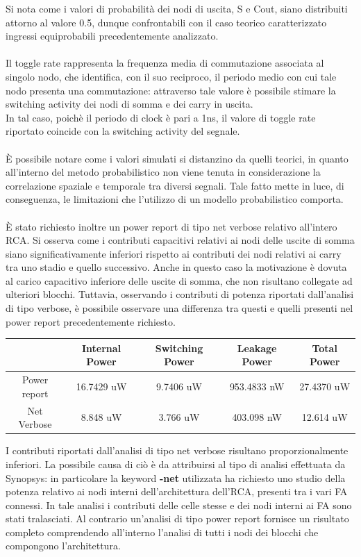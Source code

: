 \documentclass[11pt,  english, makeidx, a4paper, titlepage, oneside]{book}
\begin{document}
Si nota come i valori di probabilità dei
nodi di uscita, S e Cout, siano distribuiti attorno al valore 0.5, dunque confrontabili con il caso teorico caratterizzato ingressi equiprobabili precedentemente analizzato.
\\\\
Il toggle rate rappresenta la frequenza media di commutazione associata al singolo nodo, che identifica, con il suo reciproco, il periodo medio
con cui tale nodo presenta una commutazione: attraverso tale valore è possibile stimare la switching activity dei nodi di somma e dei carry in uscita.
\\
In tal caso, poichè il periodo di clock è pari a 1ns, il valore di toggle rate riportato coincide con la switching activity del segnale.
\\\\
È possibile notare come i valori simulati si distanzino da quelli teorici, in quanto all'interno del metodo probabilistico non viene tenuta in considerazione la correlazione spaziale e temporale tra diversi segnali. Tale fatto mette in luce, di conseguenza, le limitazioni che l'utilizzo di un modello probabilistico comporta.
\\\\
È stato richiesto inoltre un power report di tipo net verbose relativo all'intero RCA. Si osserva come i contributi capacitivi relativi
ai nodi delle uscite di somma siano significativamente inferiori rispetto ai contributi dei nodi relativi ai carry tra uno stadio e quello successivo.
Anche in questo caso la motivazione è dovuta al carico capacitivo inferiore delle uscite di somma, che non risultano collegate ad ulteriori
blocchi. Tuttavia, osservando i contributi di potenza riportati dall'analisi di tipo verbose, è possibile osservare una differenza tra questi e 
quelli presenti nel power report precedentemente richiesto. 
\\
\begin{center}
	\begin{tabular}{|c|c|c|c|c|}
	\hline
	& Internal Power & Switching Power & Leakage Power & Total Power \\ 
	\hline
	Power report & 16.7429 uW & 9.7406 uW & 953.4833 nW & 27.4370 uW \\
	\hline
	Net Verbose & 8.848 uW & 3.766 uW & 403.098 nW & 12.614 uW \\
	\hline
	\end{tabular}
\end{center}
\vspace{0.3cm}
I contributi riportati dall'analisi di tipo net verbose risultano proporzionalmente inferiori. La possibile causa di ciò è da attribuirsi al tipo
di analisi effettuata da Synopsys: in particolare la keyword \textbf{-net} utilizzata ha richiesto uno studio della potenza relativo ai nodi interni
dell'architettura dell'RCA, presenti tra i vari FA connessi. In tale analisi i contributi delle celle stesse e dei nodi interni ai FA sono stati
tralasciati. Al contrario un'analisi di tipo power report fornisce un risultato completo comprendendo all'interno l'analisi di tutti i nodi dei
blocchi che compongono l'architettura.
\newpage
\end{document}
